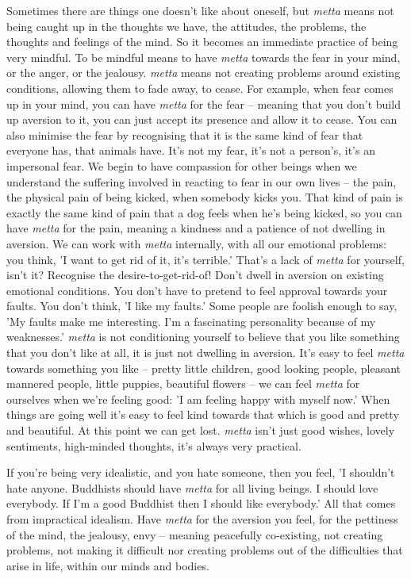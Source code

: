 Sometimes there are things one doesn't like about oneself, but \textit{metta} means not being caught up in the thoughts we have, the attitudes, the problems, the thoughts and feelings of the mind. So it becomes an immediate practice of being very mindful. To be mindful means to have \textit{metta} towards the fear in your mind, or the anger, or the jealousy. \textit{metta} means not creating problems around existing conditions, allowing them to fade away, to cease. For example, when fear comes up in your mind, you can have \textit{metta} for the fear -- meaning that you don't build up aversion to it, you can just accept its presence and allow it to cease. You can also minimise the fear by recognising that it is the same kind of fear that everyone has, that animals have. It's not my fear, it's not a person's, it's an impersonal fear. We begin to have compassion for other beings when we understand the suffering involved in reacting to fear in our own lives -- the pain, the physical pain of being kicked, when somebody kicks you. That kind of pain is exactly the same kind of pain that a dog feels when he's being kicked, so you can have \textit{metta} for the pain, meaning a kindness and a patience of not dwelling in aversion. We can work with \textit{metta} internally, with all our emotional problems: you think, 'I want to get rid of it, it's terrible.' That's a lack of \textit{metta} for yourself, isn't it? Recognise the desire-to-get-rid-of! Don't dwell in aversion on existing emotional conditions. You don't have to pretend to feel approval towards your faults. You don't think, 'I like my faults.' Some people are foolish enough to say, 'My faults make me interesting. I'm a fascinating personality because of my weaknesses.' \textit{metta} is not conditioning yourself to believe that you like something that you don't like at all, it is just not dwelling in aversion. It's easy to feel \textit{metta} towards something you like -- pretty little children, good looking people, pleasant mannered people, little puppies, beautiful flowers -- we can feel \textit{metta} for ourselves when we're feeling good: 'I am feeling happy with myself now.' When things are going well it's easy to feel kind towards that which is good and pretty and beautiful. At this point we can get lost. \textit{metta} isn't just good wishes, lovely sentiments, high-minded thoughts, it's always very practical.

If you're being very idealistic, and you hate someone, then you feel, 'I shouldn't hate anyone. Buddhists should have \textit{metta} for all living beings. I should love everybody. If I'm a good Buddhist then I should like everybody.' All that comes from impractical idealism. Have \textit{metta} for the aversion you feel, for the pettiness of the mind, the jealousy, envy -- meaning peacefully co-existing, not creating problems, not making it difficult nor creating problems out of the difficulties that arise in life, within our minds and bodies.


